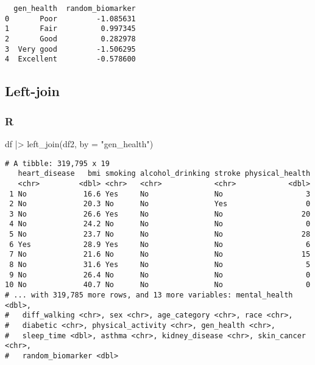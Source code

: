 \documentclass[
  letterpaper,
  DIV=11,
  numbers=noendperiod]{scrreprt}
\newenvironment{Shaded}{\begin{snugshade}}{\end{snugshade}}
\newcommand{\AttributeTok}[1]{\textcolor[rgb]{0.40,0.46,0.14}{#1}}
\newcommand{\FunctionTok}[1]{\textcolor[rgb]{0.28,0.35,0.67}{#1}}
\newcommand{\NormalTok}[1]{\textcolor[rgb]{0.00,0.46,0.62}{#1}}
\newcommand{\SpecialCharTok}[1]{\textcolor[rgb]{0.37,0.37,0.37}{#1}}
\newcommand{\StringTok}[1]{\textcolor[rgb]{0.13,0.47,0.30}{#1}}
\begin{document}
\begin{verbatim}
  gen_health  random_biomarker
0       Poor         -1.085631
1       Fair          0.997345
2       Good          0.282978
3  Very good         -1.506295
4  Excellent         -0.578600
\end{verbatim}

\hypertarget{left-join}{%
\subsection{Left-join}\label{left-join}}

\hypertarget{r-34}{%
\subsubsection{R}\label{r-34}}

\begin{Shaded}
\begin{Highlighting}[]
\NormalTok{df }\SpecialCharTok{|\textgreater{}} \FunctionTok{left\_join}\NormalTok{(df2, }\AttributeTok{by =} \StringTok{"gen\_health"}\NormalTok{)}
\end{Highlighting}
\end{Shaded}

\begin{verbatim}
# A tibble: 319,795 x 19
   heart_disease   bmi smoking alcohol_drinking stroke physical_health
   <chr>         <dbl> <chr>   <chr>            <chr>            <dbl>
 1 No             16.6 Yes     No               No                   3
 2 No             20.3 No      No               Yes                  0
 3 No             26.6 Yes     No               No                  20
 4 No             24.2 No      No               No                   0
 5 No             23.7 No      No               No                  28
 6 Yes            28.9 Yes     No               No                   6
 7 No             21.6 No      No               No                  15
 8 No             31.6 Yes     No               No                   5
 9 No             26.4 No      No               No                   0
10 No             40.7 No      No               No                   0
# ... with 319,785 more rows, and 13 more variables: mental_health <dbl>,
#   diff_walking <chr>, sex <chr>, age_category <chr>, race <chr>,
#   diabetic <chr>, physical_activity <chr>, gen_health <chr>,
#   sleep_time <dbl>, asthma <chr>, kidney_disease <chr>, skin_cancer <chr>,
#   random_biomarker <dbl>
\end{verbatim}
\end{document}
